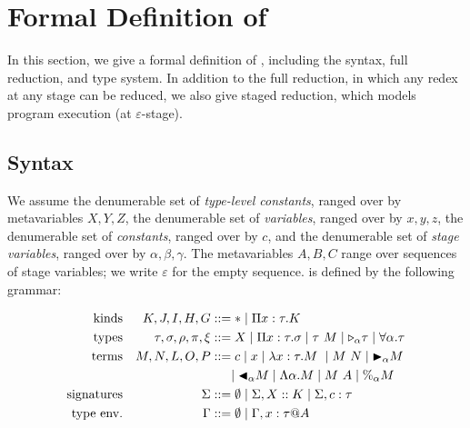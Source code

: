 
\section{Formal Definition of \LMD \label{sec:formal-definition}}
\label{sec:formal}

In this section, we give a formal definition of \LMD, including
the syntax, full reduction, and type system.  In addition to the full reduction,
in which any redex at any stage can be reduced, we also give staged reduction,
which models program execution (at \(\varepsilon\)-stage).

\subsection{Syntax}

We assume the denumerable set of \emph{type-level constants}, ranged over by
metavariables \(X, Y, Z\), the denumerable set of \emph{variables}, ranged
over by \(x,y,z\), the denumerable set of \emph{constants}, ranged over by
\(c\), and the denumerable set of \emph{stage variables}, ranged over by
\(\alpha, \beta, \gamma\).  The metavariables \(A, B, C\) range over
sequences of stage variables; we write \(\varepsilon\) for the empty
sequence. \LMD is defined by the following grammar:

{%
\begin{align*}
   \textrm{kinds}             &  & K,J,I,H,G                & ::= * \mid \Pi x:\tau.K                                                           \\
    \textrm{types}             &  & \tau,\sigma,\rho,\pi,\xi & ::= X \mid \Pi x:\tau.\sigma \mid \tau\ M \mid {\mathop{\triangleright}}_{\alpha} \tau \mid \forall\alpha.\tau \\
    \textrm{terms}             &  & M,N,L,O,P                & ::= c \mid x \mid \lambda x:\tau.M\ \mid M\ N \mid {\mathop{\blacktriangleright}}_\alpha M                   \\
                               &  &                          & \ \ \ \ \mid {\mathop{\blacktriangleleft}}_\alpha M \mid \Lambda\alpha.M \mid M\ A \mid \%_\alpha M        \\
    \textrm{signatures}         &  & \Sigma                   & ::= \emptyset \mid \Sigma, X::K \mid \Sigma, c:\tau                               \\
    \textrm{type env.} &  & \Gamma                   & ::= \emptyset \mid  \Gamma,x:\tau @A                                              \\
\end{align*}
}


